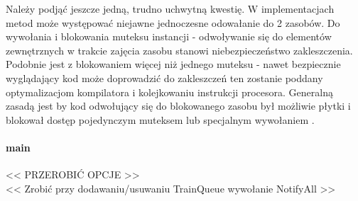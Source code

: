 Należy podjąć jeszcze jedną, trudno uchwytną kwestię. W implementacjach metod może występować niejawne jednoczesne odowałanie do 2 zasobów. Do wywołania  i blokowania muteksu instancji - odwoływanie się do elementów zewnętrznych w trakcie zajęcia zasobu stanowi niebezpieczeństwo zakleszczenia. Podobnie jest z blokowaniem więcej niż jednego muteksu - nawet bezpiecznie wyglądający kod może doprowadzić do zakleszczeń ten zostanie poddany optymalizacjom kompilatora i kolejkowaniu instrukcji procesora. Generalną zasadą jest by kod odwołujący się do blokowanego zasobu był możliwie płytki i blokował dostęp pojedynczym muteksem lub specjalnym wywołaniem .
\\
\paragraph{main}
<< PRZEROBIĆ OPCJE >>\\
<< Zrobić przy dodawaniu/usuwaniu TrainQueue wywołanie NotifyAll >>
 
